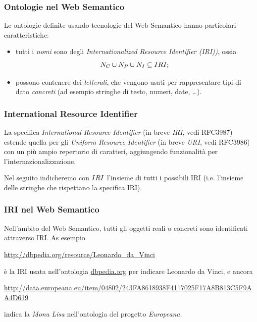 \documentclass[8pt]{beamer}
\begin{document}
\begin{frame}
\frametitle{Ontologie nel Web Semantico}

Le ontologie definite usando tecnologie del Web Semantico hanno particolari
caratteristiche:

\begin{itemize}[<+->]
	\item tutti i \emph{nomi} sono degli \emph{Internationalized Resource
	Identifier (IRI))}, ossia
\[
 N_C \cup N_P \cup N_I \subseteq IRI ;
\]
  \item possono contenere dei \emph{letterali}, che vengono usati per
  rappresentare tipi di dato \emph{concreti} (ad esempio stringhe di testo, numeri, date,
  \ldots).
\end{itemize}

\end{frame}

\begin{frame}
\frametitle{International Resource Identifier}

La specifica \emph{International Resource Identifier} (in breve \emph{IRI},
vedi RFC3987) estende quella per gli \emph{Uniform Resource Identifier} (in breve \emph{URI},
vedi RFC3986) con un pi\`u ampio repertorio di caratteri, aggiungendo
funzionalit\`a per l'internazionalizzazione.
\vspace{\baselineskip}

Nel seguito indicheremo con $IRI$ l'insieme di tutti
i possibili IRI (i.e. l'insieme delle stringhe che rispettano la 
specifica IRI).
\end{frame}

\begin{frame}
\frametitle{IRI nel Web Semantico}
Nell'ambito del Web Semantico, tutti gli oggetti reali o concreti sono
identificati attraverso IRI. As esempio
\begin{center}
 \url{http://dbpedia.org/resource/Leonardo_da_Vinci}
\end{center}
\`e la IRI usata nell'ontologia \url{dbpedia.org} per indicare
Leonardo da Vinci, e ancora 
\begin{center}
  \begin{small}
    \url{http://data.europeana.eu/item/04802/243FA8618938F4117025F17A8B813C5F9AA4D619}
  \end{small}
\end{center}
indica la \emph{Mona Lisa} nell'ontologia del progetto \emph{Europeana}.
\end{frame}
\end{document}

